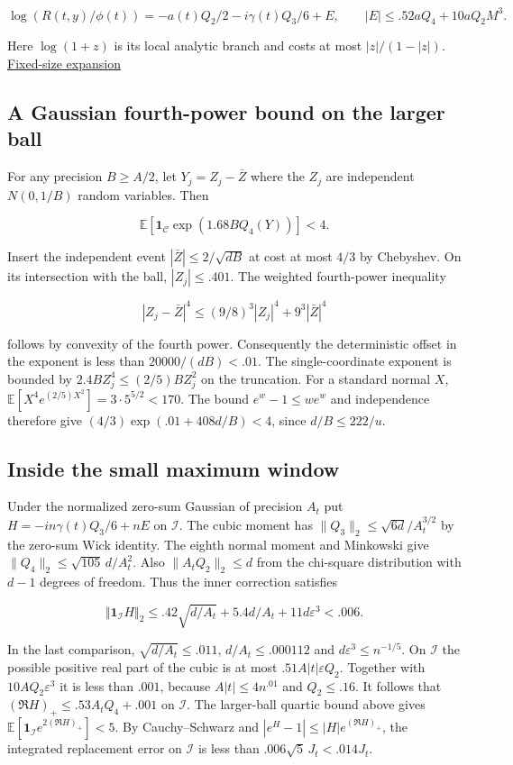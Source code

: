 \documentclass[11pt]{article}
\begin{document}
\[
\log(R(t,y)/\phi(t))=-a(t)Q_2/2-i\gamma(t)Q_3/6+E,\qquad
|E|\le .52aQ_4+10aQ_2M^3 .
\]

Here $\log(1+z)$ is its local analytic branch and costs at
most $|z|/(1-|z|)$. \href{https://github.com/ProgramComputer/open-math-research/blob/main/topics/balanced-arrays/effective-sublinear/direct-row-expansion.md}{Fixed-size expansion}

\subsection{A Gaussian fourth-power bound on the larger ball}

For any precision $B\ge A/2$, let $Y_j=Z_j-\bar Z$ where the
$Z_j$ are independent $N(0,1/B)$ random variables. Then

\[
\mathbb E[\mathbf1_{\mathcal C}\exp(1.68 B Q_4(Y))]<4 .
\]

Insert the independent event $|\bar Z|\le2/\sqrt{dB}$ at
cost at most $4/3$ by Chebyshev. On its intersection with the
ball, $|Z_j|\le.401$. The weighted fourth-power inequality

\[
|Z_j-\bar Z|^4\le(9/8)^3|Z_j|^4+9^3|\bar Z|^4
\]

follows by convexity of the fourth power. Consequently the
deterministic offset in the exponent is less than
$20000/(dB)<.01$. The single-coordinate exponent is bounded
by $2.4 B Z_j^4\le (2/5)B Z_j^2$ on the truncation.
For a standard normal $X$,
$\mathbb E[X^4e^{(2/5)X^2}]=3\cdot5^{5/2}<170$.
The bound $e^w-1\le we^w$ and independence therefore give
$(4/3)\exp(.01+408d/B)<4$, since $d/B\le222/u$.

\subsection{Inside the small maximum window}

Under the normalized zero-sum Gaussian of precision $A_t$ put
$H=-in\gamma(t)Q_3/6+nE$ on $\mathcal I$. The cubic moment has
$\|Q_3\|_2\le\sqrt{6d}/A_t^{3/2}$ by the zero-sum Wick identity.
The eighth normal moment and Minkowski give
$\|Q_4\|_2\le\sqrt{105}\,d/A_t^2$.
Also $\|A_tQ_2\|_2\le d$ from the chi-square distribution with
$d-1$ degrees of freedom. Thus the inner correction satisfies

\[
\Vert \mathbf1_{\mathcal I}H\Vert _2
\le .42\sqrt{d/A_t}+5.4d/A_t+11d\varepsilon^3<.006 .
\]

In the last comparison, $\sqrt{d/A_t}\le.011$,
$d/A_t\le.000112$ and $d\varepsilon^3\le n^{-1/5}$.
On $\mathcal I$ the possible positive real part of the cubic
is at most $.51 A |t|\varepsilon Q_2$.
Together with $10A Q_2\varepsilon^3$ it is less than $.001$,
because $A|t|\le4n^{.01}$ and $Q_2\le.16$.
It follows that $(\Re H)_+\le .53 A_t Q_4+.001$ on
$\mathcal I$. The larger-ball quartic bound above gives
$\mathbb E[\mathbf1_{\mathcal I} e^{2(\Re H)_+}]<5$.
By Cauchy--Schwarz and $|e^H-1|\le |H|e^{(\Re H)_+}$,
the integrated replacement error on $\mathcal I$ is
less than $.006\sqrt5\,J_t<.014J_t$.
\end{document}
